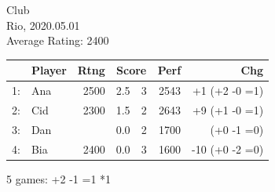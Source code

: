 \documentclass{scrartcl}
\begin{document}
\setlength{\parindent}{0cm}
\small
Club\\
Rio, 2020.05.01\\
Average Rating: 2400

\begin{longtable}{rlrr@{ / }rrr}
\toprule
  & \bfseries Player & \bfseries  Rtng & \multicolumn{2}{c}{\bfseries Score} &    \bfseries Perf & \bfseries Chg \\
\midrule
\endhead
 1:  &Ana  & 2500  &  2.5  &  3   &   2543 &  +1  (+2 -0 =1) \\
 2:  &Cid  & 2300  &  1.5  &  2   &   2643 &  +9  (+1 -0 =1) \\
 3:  &Dan  &       &  0.0  &  2   &   1700     &  (+0 -1 =0) \\
 4:  &Bia  & 2400  &  0.0  &  3   &   1600 & -10  (+0 -2 =0) \\
\bottomrule
\end{longtable}
5 games: +2 -1 =1 *1
\end{document}
